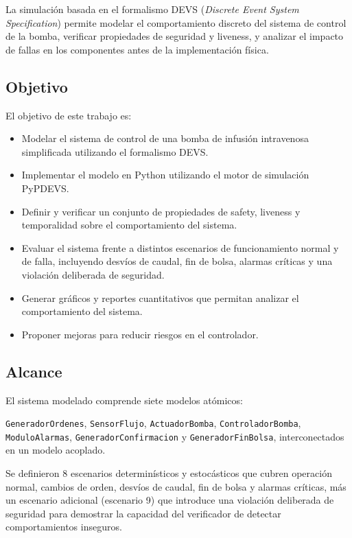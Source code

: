 \documentclass[12pt,a4paper]{article}
\begin{document}
La simulación basada en el formalismo DEVS (\textit{Discrete Event System
Specification}) permite modelar el comportamiento discreto del sistema de
control de la bomba, verificar propiedades de seguridad y liveness, y
analizar el impacto de fallas en los componentes antes de la implementación
física.

\subsection{Objetivo}

El objetivo de este trabajo es:

\begin{itemize}
    \item Modelar el sistema de control de una bomba de infusión
          intravenosa simplificada utilizando el formalismo DEVS.
    \item Implementar el modelo en Python utilizando el motor de
          simulación PyPDEVS.
    \item Definir y verificar un conjunto de propiedades de safety,
          liveness y temporalidad sobre el comportamiento del sistema.
    \item Evaluar el sistema frente a distintos escenarios de
          funcionamiento normal y de falla, incluyendo desvíos de caudal,
          fin de bolsa, alarmas críticas y una violación deliberada de
          seguridad.
    \item Generar gráficos y reportes cuantitativos que permitan
          analizar el comportamiento del sistema.
    \item Proponer mejoras para reducir riesgos en el controlador.
\end{itemize}

\subsection{Alcance}

El sistema modelado comprende siete modelos atómicos:

\texttt{GeneradorOrdenes}, \texttt{SensorFlujo}, \texttt{ActuadorBomba},
\texttt{ControladorBomba}, \texttt{ModuloAlarmas},
\texttt{GeneradorConfirmacion} y \texttt{GeneradorFinBolsa},
interconectados en un modelo acoplado.

Se definieron 8 escenarios determinísticos y estocásticos que cubren
operación normal, cambios de orden, desvíos de caudal, fin de bolsa y
alarmas críticas, más un escenario adicional (escenario 9) que introduce
una violación deliberada de seguridad para demostrar la capacidad del
verificador de detectar comportamientos inseguros.
\end{document}
